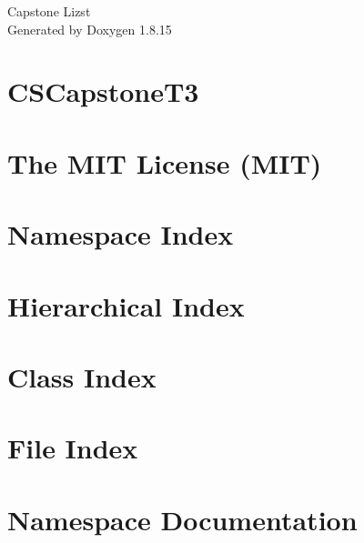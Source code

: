 \let\mypdfximage\pdfximage\def\pdfximage{\immediate\mypdfximage}\documentclass[twoside]{book}
\newcommand{\+}{\discretionary{\mbox{\scriptsize$\hookleftarrow$}}{}{}}
\newcommand{\clearemptydoublepage}{%
  \newpage{\pagestyle{empty}\cleardoublepage}%
}
\begin{document}
\hypersetup{pageanchor=false,
             bookmarksnumbered=true,
             pdfencoding=unicode
            }
\begin{titlepage}
\vspace*{7cm}
\begin{center}%
{\Large Capstone Lizst }\\
\vspace*{1cm}
{\large Generated by Doxygen 1.8.15}\\
\end{center}
\end{titlepage}
\clearemptydoublepage
{}
\tableofcontents
\clearemptydoublepage
{}
\hypersetup{pageanchor=true}

\chapter{C\+S\+Capstone\+T3}
\label{md__r_e_a_d_m_e}

\chapter{The M\+IT License (M\+IT)}
\label{md_wwwroot_lib_jquery-validation__l_i_c_e_n_s_e}

\chapter{Namespace Index}

\chapter{Hierarchical Index}

\chapter{Class Index}

\chapter{File Index}

\chapter{Namespace Documentation}






\end{document}
